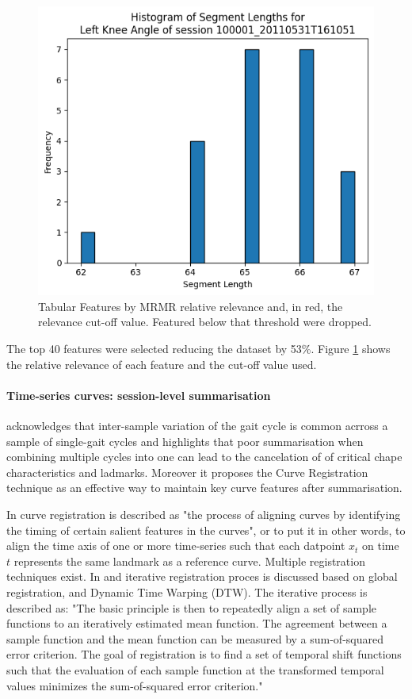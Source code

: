 \begin{figure}[ht]
    \centering
    \includegraphics[width=0.5\columnwidth]{images/hist_segment_lengths_L_knee_angle.png}
    \caption[Tabular Features by MRMR relative relevance]{Tabular Features by MRMR relative relevance and, in red, the relevance cut-off value. Featured below that threshold were dropped.\label{fig:met-mrm-feat-sel}}
\end{figure}

The top 40 features were selected reducing the dataset by 53\%. Figure \ref{fig:met-mrm-feat-sel} shows the relative relevance of each feature and the cut-off value used.

\paragraph{Time-series curves: session-level summarisation}
\citet{Chau2005} acknowledges that inter-sample variation of the gait cycle is common acrross a sample of single-gait cycles and highlights that poor summarisation when combining multiple cycles into one can lead to the cancelation of  of critical chape characteristics and ladmarks. Moreover it proposes the Curve Registration technique \citep{Ramsay1998} as an effective way to maintain key curve features after summarisation.

In \citet{Ramsay1998} curve registration is described as "the process of aligning curves by identifying the timing of certain salient features in the curves", or to put it in other words, to align the time axis of one or more time-series such that each datpoint $x_t$ on time $t$ represents the same landmark as a reference curve. Multiple registration techniques exist. In \citet{Chau2005} and iterative registration proces is discussed based on global registration, and Dynamic Time Warping (DTW). The iterative process is described as: "The basic principle is then to repeatedly align a set of sample functions to an iteratively estimated mean function. The agreement between a sample function and the mean function can be measured by a sum-of-squared error criterion. The goal of registration is to find a set of temporal shift functions such that the evaluation of each sample function at the transformed temporal values minimizes the sum-of-squared error criterion."


